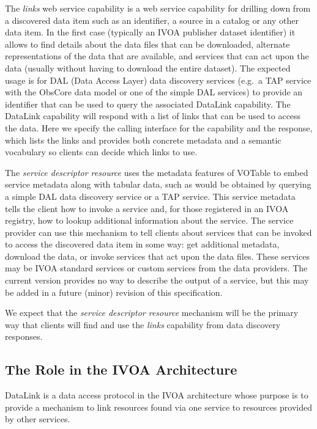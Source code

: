 \documentclass[11pt,a4paper]{ivoa}
\begin{document}
The {\em links\/} web service capability is a web service capability
for drilling
down from a discovered data item such as an identifier,
a source in a catalog or any other data item. In the first case (typically an IVOA publisher dataset identifier) it allows
 to find details about the data files that can be
downloaded, alternate representations of the data that are available, and
services that can act upon the data (usually without having to download
the entire dataset). The expected usage is for DAL (Data Access Layer)
data discovery services (e.g.\ a TAP service \citep{2010ivoa.spec.0327D}
with the ObsCore \citep{2017ivoa.spec.0509L} data
model or one of the simple DAL services) to provide an identifier that
can be used to query the associated DataLink capability. The DataLink
capability will respond with a list of links that can be used to access
the data. Here we specify the calling interface for the capability and
the response, which lists the links and provides both concrete metadata
and a semantic vocabulary so clients can decide which links to use.

The {\em service descriptor resource\/}
uses the metadata features of VOTable to
embed service metadata along with tabular data, such as would be obtained
by querying a simple DAL data discovery service or a TAP service. This
service metadata tells the client how to invoke a service and, for those
registered in an IVOA registry, how to lookup additional information
about the service. The service provider can use this mechanism to tell
clients about services that can be invoked to access the discovered
data item in some way: get additional metadata, download the data, or
invoke services that act upon the data files. These services may be
IVOA standard services or custom services from the data providers. The
current version provides no way to describe the output of a service,
but this may be added in a future (minor) revision of this specification.

We expect that the {\em service descriptor resource\/}
mechanism will be the primary way that clients will find and
use the {\em links\/} capability from data discovery
responses.


\subsection{The Role in the IVOA Architecture}

DataLink is a data access protocol in the IVOA architecture whose purpose
is to provide a mechanism to link resources found via one service to
resources provided by other services.
\end{document}
